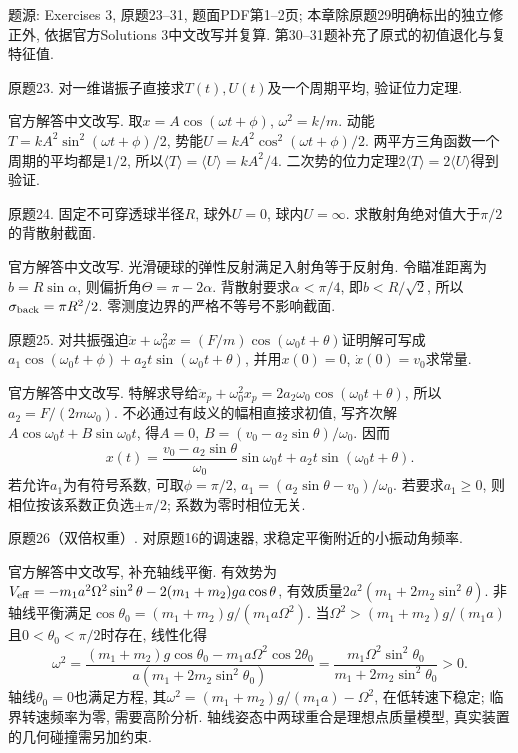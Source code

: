 题源: Exercises 3, 原题23--31, 题面PDF第1--2页; 本章除原题29明确标出的独立修正外, 依据官方Solutions 3中文改写并复算. 第30--31题补充了原式的初值退化与复特征值.

\begin{exercise}
原题23. 对一维谐振子直接求$T(t),U(t)$及一个周期平均, 验证位力定理.
\end{exercise}
\begin{solution}
官方解答中文改写. 取$x=A\cos(\omega t+\phi)$, $\omega^2=k/m$. 动能$T=kA^2\sin^2(\omega t+\phi)/2$, 势能$U=kA^2\cos^2(\omega t+\phi)/2$. 两平方三角函数一个周期的平均都是$1/2$, 所以$\langle T\rangle=\langle U\rangle=kA^2/4$. 二次势的位力定理$2\langle T\rangle=2\langle U\rangle$得到验证.
\end{solution}

\begin{exercise}
原题24. 固定不可穿透球半径$R$, 球外$U=0$, 球内$U=\infty$. 求散射角绝对值大于$\pi/2$的背散射截面.
\end{exercise}
\begin{solution}
官方解答中文改写. 光滑硬球的弹性反射满足入射角等于反射角. 令瞄准距离为$b=R\sin\alpha$, 则偏折角$\Theta=\pi-2\alpha$. 背散射要求$\alpha<\pi/4$, 即$b<R/\sqrt2$, 所以$\sigma_{\rm back}=\pi R^2/2$. 零测度边界的严格不等号不影响截面.
\end{solution}

\begin{exercise}
原题25. 对共振强迫$\ddot x+\omega_0^2x=(F/m)\cos(\omega_0t+\theta)$证明解可写成$a_1\cos(\omega_0t+\phi)+a_2t\sin(\omega_0t+\theta)$, 并用$x(0)=0$, $\dot x(0)=v_0$求常量.
\end{exercise}
\begin{solution}
官方解答中文改写. 特解求导给$\ddot x_p+\omega_0^2x_p=2a_2\omega_0\cos(\omega_0t+\theta)$, 所以$a_2=F/(2m\omega_0)$. 不必通过有歧义的幅相直接求初值, 写齐次解$A\cos\omega_0t+B\sin\omega_0t$, 得$A=0$, $B=(v_0-a_2\sin\theta)/\omega_0$. 因而
\[
x(t)=\frac{v_0-a_2\sin\theta}{\omega_0}\sin\omega_0t+a_2t\sin(\omega_0t+\theta).
\]
若允许$a_1$为有符号系数, 可取$\phi=\pi/2$, $a_1=(a_2\sin\theta-v_0)/\omega_0$. 若要求$a_1\ge0$, 则相位按该系数正负选$\pm\pi/2$; 系数为零时相位无关.
\end{solution}

\begin{exercise}
原题26（双倍权重）. 对原题16的调速器, 求稳定平衡附近的小振动角频率.
\end{exercise}
\begin{solution}
官方解答中文改写, 补充轴线平衡. 有效势为$V_{\rm eff}=-m_1a^2\Omega^2\sin^2\theta-2(m_1+m_2)ga\cos\theta$, 有效质量$2a^2(m_1+2m_2\sin^2\theta)$. 非轴线平衡满足$\cos\theta_0=(m_1+m_2)g/(m_1a\Omega^2)$. 当$\Omega^2>(m_1+m_2)g/(m_1a)$且$0<\theta_0<\pi/2$时存在, 线性化得
\[
\omega^2=
\frac{(m_1+m_2)g\cos\theta_0-m_1a\Omega^2\cos2\theta_0}
{a(m_1+2m_2\sin^2\theta_0)}
=\frac{m_1\Omega^2\sin^2\theta_0}{m_1+2m_2\sin^2\theta_0}>0.
\]
轴线$\theta_0=0$也满足方程, 其$\omega^2=(m_1+m_2)g/(m_1a)-\Omega^2$, 在低转速下稳定; 临界转速频率为零, 需要高阶分析. 轴线姿态中两球重合是理想点质量模型, 真实装置的几何碰撞需另加约束.
\end{solution}

